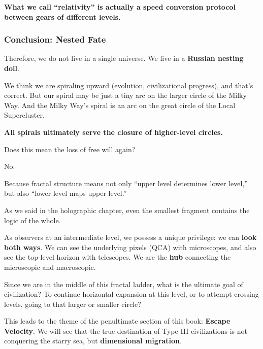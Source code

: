 \textbf{What we call ``relativity'' is actually a speed conversion protocol between gears of different levels.}

\subsubsection{Conclusion: Nested Fate}

Therefore, we do not live in a single universe. We live in a \textbf{Russian nesting doll}.

We think we are spiraling upward (evolution, civilizational progress), and that's correct. But our spiral may be just a tiny arc on the larger circle of the Milky Way. And the Milky Way's spiral is an arc on the great circle of the Local Supercluster.

\textbf{All spirals ultimately serve the closure of higher-level circles.}

Does this mean the loss of free will again?

No.

Because fractal structure means not only ``upper level determines lower level,'' but also ``lower level maps upper level.''

As we said in the holographic chapter, even the smallest fragment contains the logic of the whole.

As observers at an intermediate level, we possess a unique privilege: we can \textbf{look both ways}. We can see the underlying pixels (QCA) with microscopes, and also see the top-level horizon with telescopes. We are the \textbf{hub} connecting the microscopic and macroscopic.

Since we are in the middle of this fractal ladder, what is the ultimate goal of civilization? To continue horizontal expansion at this level, or to attempt crossing levels, going to that larger or smaller circle?

This leads to the theme of the penultimate section of this book: \textbf{Escape Velocity}. We will see that the true destination of Type III civilizations is not conquering the starry sea, but \textbf{dimensional migration}.

